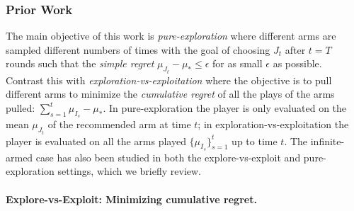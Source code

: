 


\subsubsection{Prior Work}\label{prior_work}

The main objective of this work is \emph{pure-exploration} where different arms are sampled different numbers of times with the goal of choosing $J_t$ after $t=T$ rounds such that the \emph{simple regret} $\mu_{J_t}-\mu_* \leq \epsilon$ for as small $\epsilon$ as possible. 
Contrast this with \emph{exploration-vs-exploitation} where the objective is to pull different arms to minimize the \emph{cumulative regret} of all the plays of the arms pulled: $\sum_{s=1}^t \mu_{I_s} - \mu_*$.
In pure-exploration the player is only evaluated on the mean $\mu_{J_t}$ of the recommended arm at time $t$; in exploration-vs-exploitation the player is evaluated on all the arms played $\{ \mu_{I_s} \}_{s=1}^t$ up to time $t$. 
The infinite-armed case has also been studied in both the explore-vs-exploit and pure-exploration settings, which we briefly review. 


\paragraph{Explore-vs-Exploit: Minimizing cumulative regret.} 

